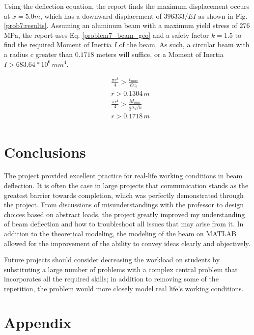 \documentclass[a4paper]{article}
\begin{document}
Using the deflection equation, the report finds the maximum displacement occurs at $x = 5.0 m$, which has a downward displacement of $396333/EI$ as shown in Fig. \ref{prob7:results}. Assuming an aluminum beam with a maximum yield stress of 276 MPa, the report uses Eq. \ref{problem7_beam_geo} and a safety factor $k=1.5$ to find the required Moment of Inertia $I$ of the beam. As such, a circular beam with a radius $c$ greater than $0.1718$ meters will suffice, or a Moment of Inertia $I > 683.64 * 10^6\,{mm}^4$.

\begin{equation}
\begin{split}
& \frac{\pi r^4}{4} > \frac{v_{max}}{Ev_a} \\
& r > 0.1304\,m \\
& \frac{\pi r^4}{4} > \frac{M_{max}}{\frac{1}{2}\sigma_Y/ k}\\
& r > 0.1718\,m \\
\end{split}
\label{problem7_beam_geo}
\end{equation}

\section{Conclusions} \label{Conclusions}
The project provided excellent practice for real-life working conditions in beam deflection. It is often the case in large projects that communication stands as the greatest barrier towards completion, which was perfectly demonstrated through the project. From discussions of misunderstandings with the professor to design choices based on abstract loads, the project greatly improved my understanding of beam deflection and how to troubleshoot all issues that may arise from it. In addition to the theoretical modeling, the modeling of the beam on MATLAB allowed for the improvement of the ability to convey ideas clearly and objectively.

Future projects should consider decreasing the workload on students by substituting a large number of problems with a complex central problem that incorporates all the required skills; in addition to removing some of the repetition, the problem would more closely model real life's working conditions.
\section{Appendix}
\end{document}
